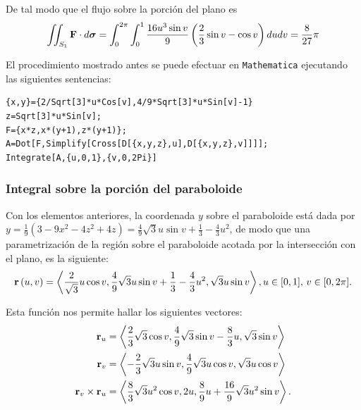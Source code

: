 De tal modo que el flujo sobre la porción del plano es
\begin{gather} \label{T1}
\iint_{S_1} {\bf F} \cdot d\boldsymbol{\sigma} = \int_{0}^{2\pi }\int_{0}^{1} \frac{16u^3 \sin v}{9} \left(\frac{2}{3}\sin v-\cos v \right) dudv= \frac{8}{27}\pi
\end{gather}

El procedimiento mostrado antes se puede efectuar en \verb"Mathematica"
ejecutando las siguientes sentencias:

\begin{tcolorbox}[title=\bf Instrucción \verb"Mathematica"]\begin{Verbatim}[formatcom=\letraverbatim]
{x,y}={2/Sqrt[3]*u*Cos[v],4/9*Sqrt[3]*u*Sin[v]-1}
z=Sqrt[3]*u*Sin[v];
F={x*z,x*(y+1),z*(y+1)};
A=Dot[F,Simplify[Cross[D[{x,y,z},u],D[{x,y,z},v]]]];
Integrate[A,{u,0,1},{v,0,2Pi}]
\end{Verbatim}
\end{tcolorbox}

\subsubsection{Integral sobre la porción del paraboloide}

Con los elementos anteriores, la coordenada $y$ sobre el paraboloide está dada por
$y = \frac{1}{9}\left( 3-9x^{2}-4z^{2}+4z\right)= \frac{4}{9}\sqrt{3}u\sin v+\frac{1}{3}-\frac{4}{3}u^{2}$,
de modo que una parametrización de la región sobre el paraboloide acotada por la intersección con el plano, es la siguiente:
\begin{gather*}
{\bf r}\left( u,v\right) =\left\langle \frac{2}{\sqrt{3}}u\cos v,\frac{4}{9}\sqrt{3}u\sin v+\frac{1}{3}-\frac{4}{3}u^{2},\sqrt{3}u\sin v\right\rangle,u\in \lbrack 0,1],\, v\in \lbrack 0,2\pi ].
\end{gather*}

Esta función nos permite hallar los siguientes vectores:
\begin{align*}
{\bf r}_{u} &= \left\langle \frac{2}{3}\sqrt{3}\cos v,\frac{4}{9}\sqrt{3}\sin v-\frac{8}{3}u,\sqrt{3}\sin v\right\rangle \\
{\bf r}_{v} &= \left\langle -\frac{2}{3}\sqrt{3}u\sin v,\frac{4}{9}\sqrt{3}u\cos v,\sqrt{3}u\cos v\right\rangle \\
{\bf r}_{v}\times {\bf r}_{u}
&=  \left\langle \frac{8}{3}\sqrt{3}u^{2}\cos v,2u,\frac{8}{9}u+\frac{16}{9}\sqrt{3}u^{2}\sin v\right\rangle.
\end{align*}

